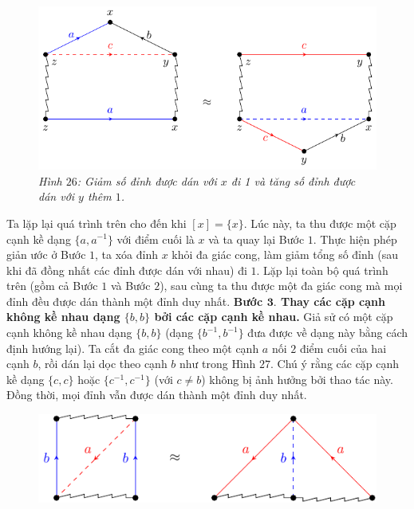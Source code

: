\begin{multicols}{2}
\begin{figure}[H]
		\vspace*{-5pt}
		\centering\captionsetup{labelformat=empty, justification=centering}
		\includegraphics[width=1\linewidth]{H26.pdf}
		\caption{\small\textit{\color{duongvaotoanhoc}Hình $26$: Giảm số đỉnh được dán với $x$ đi 1 và tăng số đỉnh được dán với $y$ thêm $1$.}}
		\vspace*{-10pt}
	\end{figure}
	Ta lặp lại quá trình trên cho đến khi $[x] = \{x\}$. Lúc này, ta thu được một cặp cạnh kề dạng $\{a,a^{-1}\}$ với điểm cuối là $x$ và ta quay lại Bước $1$. Thực hiện phép giản ước ở Bước $1$, ta xóa đỉnh $x$ khỏi đa giác cong, làm giảm tổng số đỉnh (sau khi đã đồng nhất các đỉnh được dán với nhau) đi $1$. Lặp lại toàn bộ quá trình trên (gồm cả Bước $1$ và Bước $2$), sau cùng ta thu được một đa giác cong mà mọi đỉnh đều được dán thành một đỉnh duy nhất.
	\vskip 0.1cm
	{\bf\color{duongvaotoanhoc} Bước $\pmb{3.}$ Thay các cặp cạnh không kề nhau dạng $\{b,b\}$ bởi các cặp cạnh kề nhau.} Giả sử có một cặp cạnh không kề nhau dạng $\{b,b\}$ (dạng $\{b^{-1},b^{-1}\}$ đưa được về dạng này bằng cách định hướng lại). Ta cắt đa giác cong theo một cạnh $a$ nối $2$ điểm cuối của hai cạnh $b$, rồi dán lại dọc theo cạnh $b$ như trong Hình $27$. Chú ý rằng các cặp cạnh kề dạng $\{c,c\}$ hoặc  $\{c^{-1},c^{-1}\}$ (với $c \neq b$) không bị ảnh hưởng bởi thao tác này. Đồng thời, mọi đỉnh vẫn được dán thành một đỉnh duy nhất.
	\begin{figure}[H]
		\vspace*{-5pt}
		\centering\captionsetup{labelformat=empty, justification=centering}
		\includegraphics[width=1\linewidth]{H27.pdf}

\end{figure}
\end{multicols}
